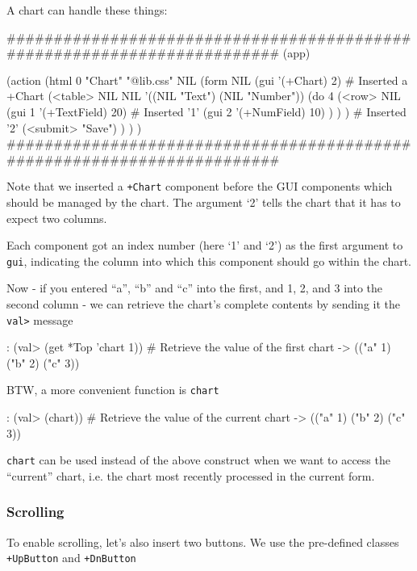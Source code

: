 A chart can handle these things:


\begin{wideverbatim}
########################################################################
(app)

(action
   (html 0 "Chart" "@lib.css" NIL
      (form NIL
         (gui '(+Chart) 2)                         # Inserted a +Chart
         (<table> NIL NIL '((NIL "Text") (NIL "Number"))
            (do 4
               (<row> NIL
                  (gui 1 '(+TextField) 20)         # Inserted '1'
                  (gui 2 '(+NumField) 10) ) ) )    # Inserted '2'
         (<submit> "Save") ) ) )
########################################################################
\end{wideverbatim}

Note that we inserted a \texttt{+Chart} component before the GUI components
which should be managed by the chart. The argument `2' tells the chart
that it has to expect two columns.

Each component got an index number (here `1' and `2') as the first
argument to \texttt{gui}, indicating the column into which this component
should go within the chart.

Now - if you entered ``a'', ``b'' and ``c'' into the first, and 1, 2, and 3
into the second column - we can retrieve the chart's complete contents
by sending it the \texttt{val>} message


\begin{wideverbatim}
: (val> (get *Top 'chart 1))  # Retrieve the value of the first chart
-> (("a" 1) ("b" 2) ("c" 3))
\end{wideverbatim}

BTW, a more convenient function is \texttt{chart}


\begin{wideverbatim}
: (val> (chart))  # Retrieve the value of the current chart
-> (("a" 1) ("b" 2) ("c" 3))
\end{wideverbatim}

\texttt{chart} can be used instead of the above construct when we want to
access the ``current'' chart, i.e. the chart most recently processed in
the current form.


\subsubsection{ Scrolling}
\label{sec:appl-devel-scrolling}%

To enable scrolling, let's also insert two buttons. We use the
pre-defined classes \texttt{+UpButton} and \texttt{+DnButton}


